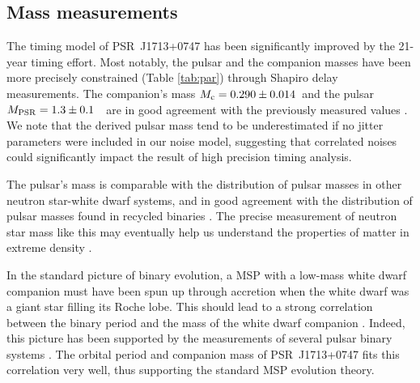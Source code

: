 \subsection{Mass measurements}
\label{sec:mass}
The timing model of PSR~J1713+0747 has been significantly improved by the 21-year timing effort.
Most notably, the pulsar and the companion masses have been more precisely
constrained (Table \ref{tab:par}) through Shapiro delay measurements. The
companion's mass $M_{\rm c} = 0.290\pm0.014$~\Msun and the pulsar $M_{\rm
PSR}=1.3\pm0.1$~\Msun\, are in good agreement with the previously measured values \cite{sns+05}.
We note that the derived pulsar mass tend to be underestimated 
if no jitter parameters were included in our noise model, suggesting that
correlated noises could significantly impact the result of high
precision timing analysis.


The pulsar's mass is comparable with the distribution of pulsar masses
in other neutron star-white dwarf systems, and in good
agreement with the distribution of pulsar masses found in recycled binaries
\citep{opns12,kkdt13}. The precise measurement of neutron star mass like this
may eventually help us understand the properties of matter in extreme 
density \citep{lat12}.

In the standard picture of binary evolution, a MSP with a low-mass white dwarf companion must have been spun up through accretion when the white dwarf was a giant star filling its Roche lobe. 
This should lead to a strong correlation between the binary period and the mass of the white dwarf companion \citep{rpj+95, ts99a, prp02b}. 
Indeed, this picture has been supported by the measurements of several pulsar
binary systems \citep[e.g.,][]{vbb+01, ktr94, th14}.  
The orbital period and companion mass of PSR~J1713+0747 fits
this correlation very well, thus supporting the standard MSP evolution theory. %


